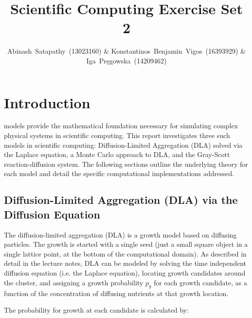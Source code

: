 \documentclass[10pt, journal]{IEEEtran}
\begin{document}
\title{Scientific Computing Exercise Set 2}

\author{Abinash~Satapathy~(13023160) \& Konstantinos~Benjamin~Vigos~(16393929) \& Iga~Pręgowska~(14209462)}




\maketitle

\section{Introduction} \label{intro}

 models provide the mathematical foundation necessary for simulating complex physical systems in scientific computing. This report investigates three such models in scientific computing: Diffusion-Limited Aggregation (DLA) solved via the Laplace equation, a Monte Carlo approach to DLA, and the Gray-Scott reaction-diffusion system. The following sections outline the underlying theory for each model and detail the specific computational implementations addressed.

\subsection{Diffusion-Limited Aggregation (DLA) via the Diffusion Equation}

The diffusion-limited aggregation (DLA) is a growth model based on diffusing particles. The growth is started with a single seed (just a small square object in a single lattice point, at the bottom of the computational domain). As described in detail in the lecture notes, DLA can be modeled by solving the time independent diffusion equation (i.e. the Laplace equation), locating growth candidates around the cluster, and assigning a growth probability $p_{g}$ for each growth candidate, as a function of the concentration of diffusing nutrients at that growth location. 

The probability for growth at each candidate is calculated by:
\end{document}
